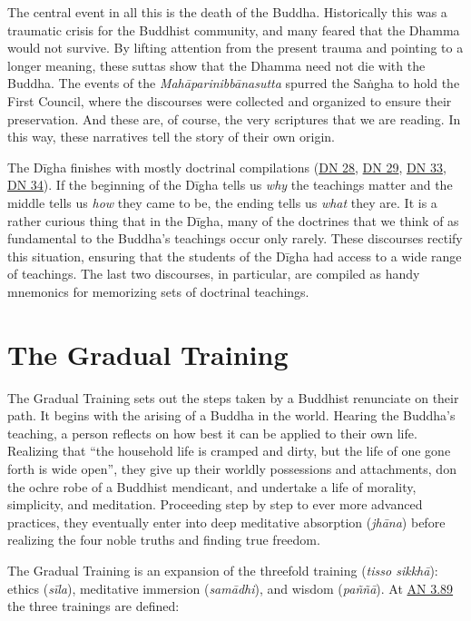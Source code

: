 \documentclass[12pt,openany]{book}%
\begin{document}
The central event in all this is the death of the Buddha. Historically this was a traumatic crisis for the Buddhist community, and many feared that the Dhamma would not survive. By lifting attention from the present trauma and pointing to a longer meaning, these suttas show that the Dhamma need not die with the Buddha. The events of the \textit{\textsanskrit{Mahāparinibbānasutta}} spurred the \textsanskrit{Saṅgha} to hold the First Council, where the discourses were collected and organized to ensure their preservation. And these are, of course, the very scriptures that we are reading. In this way, these narratives tell the story of their own origin.

The \textsanskrit{Dīgha} finishes with mostly doctrinal compilations (\href{https://suttacentral.net/dn28}{DN 28}, \href{https://suttacentral.net/dn29}{DN 29}, \href{https://suttacentral.net/dn33}{DN 33}, \href{https://suttacentral.net/dn34}{DN 34}). If the beginning of the \textsanskrit{Dīgha} tells us \emph{why} the teachings matter and the middle tells us \emph{how} they came to be, the ending tells us \emph{what} they are. It is a rather curious thing that in the \textsanskrit{Dīgha}, many of the doctrines that we think of as fundamental to the Buddha’s teachings occur only rarely. These discourses rectify this situation, ensuring that the students of the \textsanskrit{Dīgha} had access to a wide range of teachings. The last two discourses, in particular, are compiled as handy mnemonics for memorizing sets of doctrinal teachings.

\section*{The Gradual Training}

The Gradual Training sets out the steps taken by a Buddhist renunciate on their path. It begins with the arising of a Buddha in the world. Hearing the Buddha’s teaching, a person reflects on how best it can be applied to their own life. Realizing that “the household life is cramped and dirty, but the life of one gone forth is wide open”, they give up their worldly possessions and attachments, don the ochre robe of a Buddhist mendicant, and undertake a life of morality, simplicity, and meditation. Proceeding step by step to ever more advanced practices, they eventually enter into deep meditative absorption (\textit{\textsanskrit{jhāna}}) before realizing the four noble truths and finding true freedom.

The Gradual Training is an expansion of the threefold training (\textit{tisso \textsanskrit{sikkhā}}): ethics (\textit{\textsanskrit{sīla}}), meditative immersion (\textit{\textsanskrit{samādhi}}), and wisdom (\textit{\textsanskrit{paññā}}). At \href{https://suttacentral.net/an3.89}{AN 3.89} the three trainings are defined:
\end{document}
